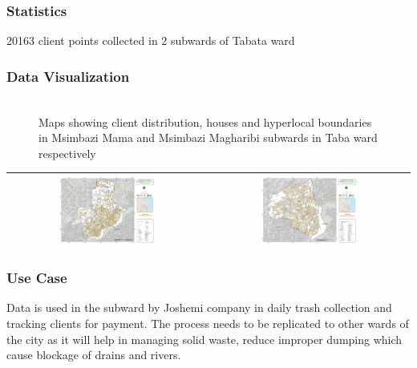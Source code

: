 \documentclass[a4paper,12pt,twoside]{article}
\begin{document}
\subsubsection{Statistics}
20163 client points collected in 2 subwards of Tabata ward

\subsubsection{Data Visualization}

\begin{figure}[h]
	\caption{Maps showing client distribution, houses and hyperlocal boundaries in Msimbazi Mama and Msimbazi Magharibi subwards in Taba ward respectively}
	\centering
	\includegraphics[width=0\textwidth]{images/Building_Footprint_Digitization.png}
\end{figure}
\begin{tabular}{|c@{}c|}
	\hline
	
	\includegraphics[width=0.5\textwidth]{images/Msimbazi_mama.png}&%
	\includegraphics[width=0.5\textwidth]{images/Msimbazi_magharibi.png}\\
	\hline
\end{tabular}

\subsubsection{Use Case}
Data is used in the subward by Joshemi company in daily trash collection and tracking clients for payment. The process needs to be replicated to other wards of the city as it will help in managing solid waste, reduce improper dumping which cause blockage of drains and rivers. 
\end{document}
